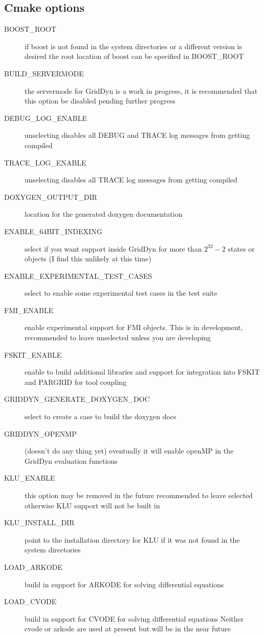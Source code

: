 \documentclass[12pt]{article} %
\begin{document}
\subsection {Cmake options}
\begin{description}
\item [BOOST\_ROOT]  if boost is not found in the system directories or a different version is desired the root location of boost can be specified in BOOST\_ROOT
\item [BUILD\_SERVERMODE]  the servermode for GridDyn is a work in progress, it is recommended that this option be disabled pending further progress
\item [DEBUG\_LOG\_ENABLE] unselecting disables all DEBUG and TRACE log messages from getting compiled
\item [TRACE\_LOG\_ENABLE] unselecting disables all TRACE log messages from getting compiled
\item [DOXYGEN\_OUTPUT\_DIR] location for the generated doxygen documentation
\item [ENABLE\_64BIT\_INDEXING]  select if you want support inside GridDyn for more than $2^{32}-2$ states or objects (I find this unlikely at this time)
\item [ENABLE\_EXPERIMENTAL\_TEST\_CASES]  select to enable some experimental test cases in the test suite
\item [FMI\_ENABLE] enable experimental support for FMI objects.  This is in development,  recommended to leave unselected unless you are developing 
\item [FSKIT\_ENABLE] enable to build additional libraries and support for integration into FSKIT and PARGRID for tool coupling
\item [GRIDDYN\_GENERATE\_DOXYGEN\_DOC]  select to create a case to build the doxygen docs{\tiny }
\item [GRIDDYN\_OPENMP] (doesn't do any thing yet) eventually it will enable openMP in the GridDyn evaluation functions
\item [KLU\_ENABLE] this option may be removed in the future recommended to leave selected otherwise KLU support will not be built in
\item [KLU\_INSTALL\_DIR]  point to the installation directory for KLU if it was not found in the system directories
\item [LOAD\_ARKODE] build in support for ARKODE for solving differential equations
\item [LOAD\_CVODE] build in support for CVODE for solving differential equations Neither cvode or arkode are used at present but will be in the near future

\end{description}
\end{document}
